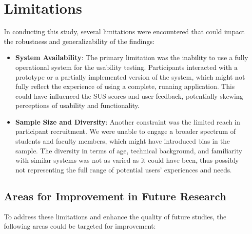 \documentclass[conference]{IEEEtran}
\begin{document}
    

\section{Limitations}
    In conducting this study, several limitations were encountered that could impact the robustness and generalizability of the findings:
    
    \begin{itemize}
        \item \textbf{System Availability}: The primary limitation was the inability to use a fully operational system for the usability testing. Participants interacted with a prototype or a partially implemented version of the system, which might not fully reflect the experience of using a complete, running application. This could have influenced the SUS scores and user feedback, potentially skewing perceptions of usability and functionality.
    
        \item \textbf{Sample Size and Diversity}: Another constraint was the limited reach in participant recruitment. We were unable to engage a broader spectrum of students and faculty members, which might have introduced bias in the sample. The diversity in terms of age, technical background, and familiarity with similar systems was not as varied as it could have been, thus possibly not representing the full range of potential users' experiences and needs.
    \end{itemize}
    
    \subsection{Areas for Improvement in Future Research}
    To address these limitations and enhance the quality of future studies, the following areas could be targeted for improvement:
    
\end{document}
